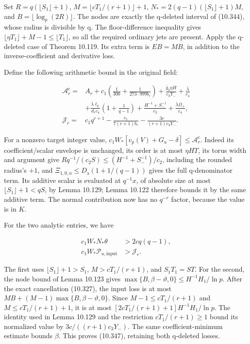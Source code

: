 \documentclass[
  11pt,
  a4paper,
]{article}
\begin{document}
Set \(R=q(\lfloor S_1\rfloor+1)\), \(M=\lfloor cT_1/(r+1)\rfloor+1\),
\(N_*=2(q-1)(\lfloor S_1\rfloor+1)M\), and
\(B=\lfloor\log_p(2R)\rfloor\). The nodes are exactly the q-deleted
interval of (10.344), whose radius is divisible by q. The
floor-difference inequality gives
\(\lfloor\eta T_1\rfloor+M-1\le\lfloor T_1\rfloor\), so all the required
ordinary jets are present. Apply the q-deleted case of Theorem 10.119.
Its extra term is \(EB=MB\), in addition to the inverse-coefficient and
derivative loss.

Define the following arithmetic bound in the original field:

\[
\begin{aligned}
\mathcal A_r^{\mathrm c}={}&A_r+
c_1\left(\frac1{300}+\frac1{273\cdot999b_r}\right)
 +\frac{\bar g_9\eta H}{c_3Y_-}+\frac{\bar\lambda}{c_4}\\
&+\frac{\bar\lambda\ell_q}{d_rc_4}
\left(1+\frac1{q-1}\right)
 +\frac{H^{-1}+S_-^{-1}}{c_2}+\frac{\bar\lambda\Omega_+}{c_4},\\
\mathcal J_r={}&c_1q^{r+1}
 -\frac{c_1}{7(r+1)b_r}
 -\frac{3c}{(r+1)c_3Y_-}.
\end{aligned}
\tag{10.346}
\]

For a nonzero target integer value,
\(c_1W_*[v_p(V)+G_u-\delta]\le\mathcal A_r^{\mathrm c}\). Indeed its
coefficient/scalar envelope is unchanged, its order is at most
\(\eta HT\), its torus width and argument give
\(Rq^{-1}/(c_2S)\le(H^{-1}+S_-^{-1})/c_2\), including the rounded
radius's \(+1\), and \(\Xi_{1,0,u}\le D_{\mathrm a}(1+1/(q-1))\) gives
the full q-denominator term. Its additive scalar is evaluated at
\(q^{-1}x\), of absolute size at most \(\lfloor S_1\rfloor+1<qS\), by
Lemma 10.129; Lemma 10.122 therefore bounds it by the same additive
term. The normal contribution now has no \(q^{-r}\) factor, because the
value is in \(K\).

For the two analytic entries, we have

\[
\begin{aligned}
c_1W_*N_*\theta&>2cq(q-1),\\
c_1W_*\mathcal P_{u,\mathrm{input}}&>\mathcal J_r.
\end{aligned}
\tag{10.347}
\]

The first uses \(\lfloor S_1\rfloor+1>S_1\), \(M>cT_1/(r+1)\), and
\(S_1T_1=ST\). For the second, the node bound of Lemma 10.123 gives
\(\max\{B,\beta-\vartheta,0\}\le H^{-1}H_1/\ln p\). After the exact
cancellation (10.327), the input loss is at most
\(MB+(M-1)\max\{B,\beta-\vartheta,0\}\). Since \(M-1\le cT_1/(r+1)\) and
\(M\le cT_1/(r+1)+1\), it is at most \([2cT_1/(r+1)+1]H^{-1}H_1/\ln p\).
The identity used in Lemma 10.129 and the restriction \(cT_1/(r+1)\ge1\)
bound its normalized value by \(3c/((r+1)c_3Y_-)\). The same
coefficient-minimum estimate bounds \(\beta\). This proves (10.347),
retaining both q-deleted losses.
\end{document}
